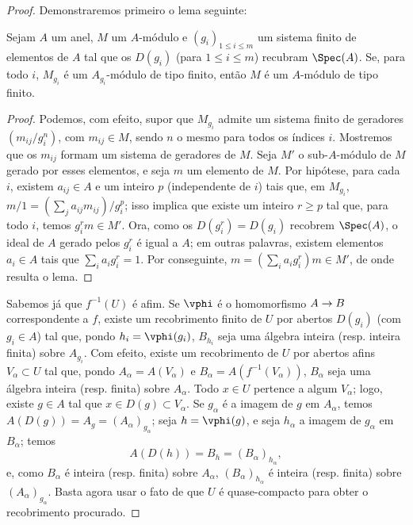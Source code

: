 \documentclass[oneside,10pt]{amsart}
\makeatletter
\renewcommand{\leq}{\leqslant}
\renewcommand{\geq}{\geqslant}
\newcommand{\ega@arrow}[2]{\mathchoice{#1}{#2}{#2}{#2}}
\renewcommand{\to}{\ega@arrow{\longrightarrow}{\rightarrow}}
\let\EGAOriginalLabel\label
\renewcommand{\label}[1]{\phantomsection\EGAOriginalLabel{#1}}
\makeatother
\begin{document}
\begin{proof}
Demonstraremos primeiro o lema seguinte:

  \begin{lemma}[6.1.4.1]
  \label{II.6.1.4.1}
  Sejam $A$ um anel, $M$ um $A$-módulo e $(g_i)_{1\leq i\leq m}$ um sistema finito de elementos de $A$ tal que os $D(g_i)$ (para $1\leq i\leq m$) recubram $\Spec(A)$.
  Se, para todo $i$, $M_{g_i}$ é um $A_{g_i}$-módulo de tipo finito, então $M$ é um $A$-módulo de tipo finito.
  \end{lemma}

  \begin{proof}
  Podemos, com efeito, supor que $M_{g_i}$ admite um sistema finito de geradores $(m_{ij}/g_i^n)$, com $m_{ij}\in M$, sendo $n$ o mesmo para todos os índices $i$.
  Mostremos que os $m_{ij}$ formam um sistema de geradores de $M$.
  Seja $M'$ o sub-$A$-módulo de $M$ gerado por esses elementos, e seja $m$ um elemento de $M$.
  Por hipótese, para cada $i$, existem $a_{ij}\in A$ e um inteiro $p$ (independente de $i$) tais que, em $M_{g_i}$, $m/1=(\sum_j a_{ij}m_{ij})/g_i^p$;
  isso implica que existe um inteiro $r\geq p$ tal que, para todo $i$, temos $g_i^rm\in M'$.
  Ora, como os $D(g_i^r)=D(g_i)$ recobrem $\Spec(A)$, o ideal de $A$ gerado pelos $g_i^r$ é igual a $A$; em outras palavras, existem elementos $a_i\in A$ tais que $\sum_i a_ig_i^r=1$.
  Por conseguinte, $m=(\sum_i a_i g_i^r)m\in M'$, de onde resulta o lema.
  \end{proof}

Sabemos já  que $f^{-1}(U)$ é afim.
Se $\vphi$ é o homomorfismo $A\to B$ correspondente a $f$, existe um recobrimento finito de $U$ por abertos $D(g_i)$ (com $g_i\in A$) tal que, pondo $h_i=\vphi(g_i)$, $B_{h_i}$ seja uma álgebra inteira (resp. inteira finita) sobre $A_{g_i}$.
Com efeito, existe um recobrimento de $U$ por abertos afins $V_\alpha\subset U$ tal que, pondo $A_\alpha=A(V_\alpha)$ e $B_\alpha=A(f^{-1}(V_\alpha))$, $B_\alpha$ seja uma álgebra inteira (resp. finita) sobre $A_\alpha$.
Todo $x\in U$ pertence a algum $V_\alpha$; logo, existe $g\in A$ tal que $x\in D(g)\subset V_\alpha$.
Se $g_\alpha$ é a imagem de $g$ em $A_\alpha$, temos $A(D(g))=A_g=(A_\alpha)_{g_\alpha}$;
seja $h=\vphi(g)$, e seja $h_\alpha$ a imagem de $g_\alpha$ em $B_\alpha$;
temos
\[
  A(D(h))=B_h=(B_\alpha)_{h_\alpha},
\]
e, como $B_\alpha$ é inteira (resp. finita) sobre $A_\alpha$, $(B_\alpha)_{h_\alpha}$ é inteira (resp. finita) sobre $(A_\alpha)_{g_\alpha}$.
Basta agora usar o fato de que $U$ é quase-compacto para obter o recobrimento procurado.


\end{proof}
\end{document}
